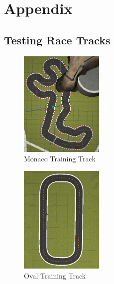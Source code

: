 \documentclass[journal]{IEEEtran}
\begin{document}



\newpage

\section{Appendix}

\subsection{Testing Race Tracks}
\begin{figure}[htbp]
\begin{center}
\includegraphics[width=4cm]{trainingTrack2}
\end{center}
\vspace{-2mm}
\caption{Monaco Training Track}
\label{monaco}
\end{figure}


\begin{figure}[htbp]
\begin{center}
\includegraphics[width=4cm]{trainingTrack3}
\end{center}
\vspace{-2mm}
\caption{Oval Training Track}
\label{oval}
\end{figure}
\end{document}
